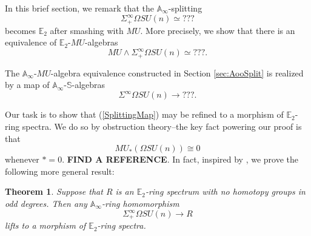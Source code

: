 \documentclass[reqno, oneside]{amsart}
\theoremstyle{definition}
\theoremstyle{plain}
\newtheorem{thm}[nul]{Theorem}
\DeclareMathOperator{\smsh}{\wedge}
\begin{document}
In this brief section, we remark that the $\mathbb{A}_\infty$-splitting $$\Sigma^{\infty}_+ \Omega SU(n) \simeq ???$$ becomes $\mathbb{E}_2$ after smashing with $MU$.  More precisely, we show that there is an equivalence of $\mathbb{E}_2$-$MU$-algebras
$$MU \smsh \Sigma^{\infty}_+ \Omega SU(n) \simeq ???.$$

The $\mathbb{A}_\infty$-$MU$-algebra equivalence constructed in Section \ref{sec:AooSplit} is realized by a map of $\mathbb{A}_\infty$-$\mathbb{S}$-algebras
\begin{equation} \label{SplittingMap}
\Sigma^{\infty} \Omega SU(n) \longrightarrow ???.
\end{equation}

Our task is to show that (\ref{SplittingMap}) may be refined to a morphism of $\mathbb{E}_2$-ring spectra.  We do so by obstruction theory--the key fact powering our proof is that 
$$MU_*\left(\Omega SU(n)\right) \cong 0$$
whenever $*=0$.  \textbf{FIND A REFERENCE}.  In fact, inspired by \cite{ChadwickMandell}, we prove the following more general result:

\begin{thm}
Suppose that $R$ is an $\mathbb{E}_2$-ring spectrum with no homotopy groups in odd degrees.  Then any $\mathbb{A}_\infty$-ring homomorphism %
$$\Sigma^{\infty}_+ \Omega SU(n) \rightarrow R$$
lifts to a morphism of $\mathbb{E}_2$-ring spectra.
\end{thm}
\end{document}
